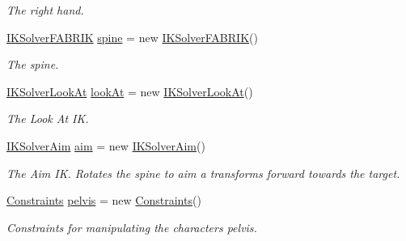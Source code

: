 \begin{DoxyCompactItemize}
\begin{DoxyCompactList}\small\item\em The right hand. \end{DoxyCompactList}\item 
\mbox{\hyperlink{class_root_motion_1_1_final_i_k_1_1_i_k_solver_f_a_b_r_i_k}{I\+K\+Solver\+F\+A\+B\+R\+IK}} \mbox{\hyperlink{class_root_motion_1_1_final_i_k_1_1_biped_i_k_solvers_ac19381c7170ae0d3a9217360bc2b2dfd}{spine}} = new \mbox{\hyperlink{class_root_motion_1_1_final_i_k_1_1_i_k_solver_f_a_b_r_i_k}{I\+K\+Solver\+F\+A\+B\+R\+IK}}()
\begin{DoxyCompactList}\small\item\em The spine. \end{DoxyCompactList}\item 
\mbox{\hyperlink{class_root_motion_1_1_final_i_k_1_1_i_k_solver_look_at}{I\+K\+Solver\+Look\+At}} \mbox{\hyperlink{class_root_motion_1_1_final_i_k_1_1_biped_i_k_solvers_a79e88262392136532d3f55bef8c2fdc2}{look\+At}} = new \mbox{\hyperlink{class_root_motion_1_1_final_i_k_1_1_i_k_solver_look_at}{I\+K\+Solver\+Look\+At}}()
\begin{DoxyCompactList}\small\item\em The Look At IK. \end{DoxyCompactList}\item 
\mbox{\hyperlink{class_root_motion_1_1_final_i_k_1_1_i_k_solver_aim}{I\+K\+Solver\+Aim}} \mbox{\hyperlink{class_root_motion_1_1_final_i_k_1_1_biped_i_k_solvers_ab5ef210271441f309029f7016ef4fd44}{aim}} = new \mbox{\hyperlink{class_root_motion_1_1_final_i_k_1_1_i_k_solver_aim}{I\+K\+Solver\+Aim}}()
\begin{DoxyCompactList}\small\item\em The Aim IK. Rotates the spine to aim a transform\textquotesingle{}s forward towards the target. \end{DoxyCompactList}\item 
\mbox{\hyperlink{class_root_motion_1_1_final_i_k_1_1_constraints}{Constraints}} \mbox{\hyperlink{class_root_motion_1_1_final_i_k_1_1_biped_i_k_solvers_a1a35e0f2ddbb2dca73da4e6d22fa1025}{pelvis}} = new \mbox{\hyperlink{class_root_motion_1_1_final_i_k_1_1_constraints}{Constraints}}()
\begin{DoxyCompactList}\small\item\em Constraints for manipulating the character\textquotesingle{}s pelvis. \end{DoxyCompactList}\end{DoxyCompactItemize}
